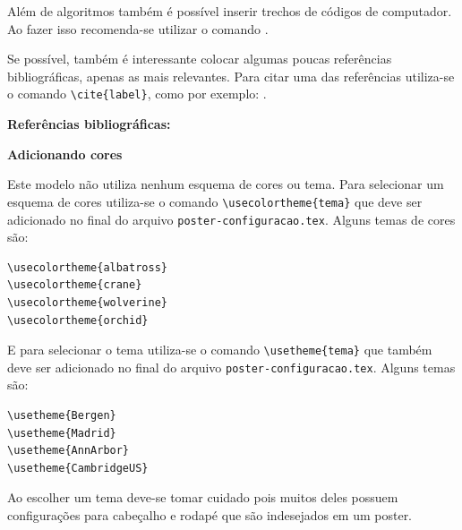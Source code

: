 \documentclass[]{beamer}
\begin{document}
\begin{frame}[t,fragile]
\begin{columns}[t]
\begin{column}{0.4\textwidth}
      Além de algoritmos também é possível inserir trechos de códigos de
      computador. Ao fazer isso recomenda-se utilizar o comando
      \lstinline++.
      

      Se possível, também é interessante colocar algumas poucas referências
      bibliográficas, apenas as mais relevantes. Para citar uma das referências
      utiliza-se o comando \lstinline+\cite{label}+, como por exemplo:
      \cite{amostra}.

      \textbf{Referências bibliográficas:}

      \printbibliography

      \textbf{Adicionando cores}

      Este modelo não utiliza nenhum esquema de cores ou tema. Para selecionar
      um esquema de cores utiliza-se o comando \lstinline+\usecolortheme{tema}+
      que deve ser adicionado no final do arquivo
      \lstinline+poster-configuracao.tex+. Alguns temas de cores são:
      \begin{lstlisting}
\usecolortheme{albatross}
\usecolortheme{crane}
\usecolortheme{wolverine}
\usecolortheme{orchid}
      \end{lstlisting}
      E para selecionar o tema utiliza-se o comando
      \lstinline+\usetheme{tema}+ que também deve ser adicionado no final do
      arquivo \lstinline+poster-configuracao.tex+. Alguns temas são:
      \begin{lstlisting}
\usetheme{Bergen}
\usetheme{Madrid}
\usetheme{AnnArbor}
\usetheme{CambridgeUS}
      \end{lstlisting}
      Ao escolher um tema deve-se tomar cuidado pois muitos deles possuem
      configurações para cabeçalho e rodapé que são indesejados em um poster.


\end{column}
\end{columns}
\end{frame}
\end{document}
